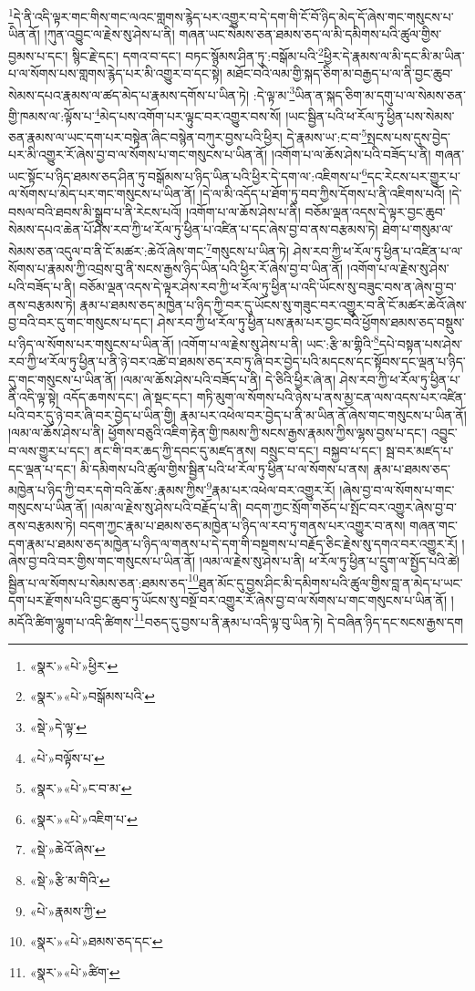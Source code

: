 \footnote{«སྣར་»«པེ་»ཕྱིར་}དེ་ནི་འདི་ལྟར་གང་གིས་གང་ལའང་གླགས་རྙེད་པར་འགྱུར་བ་དེ་དག་གི་ངོ་བོ་ཉིད་མེད་དོ་ཞེས་གང་གསུངས་པ་ཡིན་ནོ། །ཀུན་འབྱུང་ལ་རྗེས་སུ་ཤེས་པ་ནི། གཞན་ཡང་སེམས་ཅན་ཐམས་ཅད་ལ་མི་དམིགས་པའི་ཚུལ་གྱིས་བྱམས་པ་དང་། སྙིང་རྗེ་དང་། དགའ་བ་དང་། བཏང་སྙོམས་ཤིན་ཏུ་:བསྒོམ་པའི་\footnote{«སྣར་»«པེ་»བསྒོམས་པའི་}ཕྱིར་དེ་རྣམས་ལ་མི་དང་མི་མ་ཡིན་པ་ལ་སོགས་པས་གླགས་རྙེད་པར་མི་འགྱུར་བ་དང་སྟེ། མཐོང་བའི་ལམ་གྱི་སྐད་ཅིག་མ་བརྒྱད་པ་ལ་ནི་བྱང་ཆུབ་སེམས་དཔའ་རྣམས་ལ་ཚད་མེད་པ་རྣམས་དགོས་པ་ཡིན་ཏེ། :དེ་ལྟ་མ་\footnote{«སྡེ་»དེ་ལྟ་}ཡིན་ན་སྐད་ཅིག་མ་དགུ་པ་ལ་སེམས་ཅན་གྱི་ཁམས་ལ་:ལྟོས་པ་\footnote{«པེ་»བལྟོས་པ་}མེད་པས་འགོག་པར་ལྟུང་བར་འགྱུར་བས་སོ། །ཡང་སྦྱིན་པའི་ཕ་རོལ་ཏུ་ཕྱིན་པས་སེམས་ཅན་རྣམས་ལ་ཡང་དག་པར་བསྟེན་ཞིང་བསྙེན་བཀུར་བྱས་པའི་ཕྱིར། དེ་རྣམས་ཡ་:ང་བ་\footnote{«སྣར་»«པེ་»ང་བ་མ་}སྤངས་པས་དུས་བྱེད་པར་མི་འགྱུར་རོ་ཞེས་བྱ་བ་ལ་སོགས་པ་གང་གསུངས་པ་ཡིན་ནོ། །འགོག་པ་ལ་ཆོས་ཤེས་པའི་བཟོད་པ་ནི། གཞན་ཡང་སྟོང་པ་ཉིད་ཐམས་ཅད་ཤིན་ཏུ་བསྒོམས་པ་ཉིད་ཡིན་པའི་ཕྱིར་དེ་དག་ལ་:འཇིགས་པ་\footnote{«སྣར་»«པེ་»འཇིག་པ་}དང་རེངས་པར་གྱུར་པ་ལ་སོགས་པ་མེད་པར་གང་གསུངས་པ་ཡིན་ནོ། །དེ་ལ་མི་འདོད་པ་ཐོག་ཏུ་བབ་ཀྱིས་དོགས་པ་ནི་འཇིགས་པའོ། །དེ་བསལ་བའི་ཐབས་མི་སྒྲུབ་པ་ནི་རེངས་པའོ། །འགོག་པ་ལ་ཆོས་ཤེས་པ་ནི། བཅོམ་ལྡན་འདས་དེ་ལྟར་བྱང་ཆུབ་སེམས་དཔའ་ཆེན་པོ་ཤེས་རབ་ཀྱི་ཕ་རོལ་ཏུ་ཕྱིན་པ་འཛིན་པ་དང་ཞེས་བྱ་བ་ནས་བརྩམས་ཏེ། ཐེག་པ་གསུམ་ལ་སེམས་ཅན་འདུལ་བ་ནི་ངོ་མཚར་:ཆེའོ་ཞེས་གང་\footnote{«སྡེ་»ཆེའོ་ཞེས་}གསུངས་པ་ཡིན་ཏེ། ཤེས་རབ་ཀྱི་ཕ་རོལ་ཏུ་ཕྱིན་པ་འཛིན་པ་ལ་སོགས་པ་རྣམས་ཀྱི་འབྲས་བུ་ནི་སངས་རྒྱས་ཉིད་ཡིན་པའི་ཕྱིར་རོ་ཞེས་བྱ་བ་ཡིན་ནོ། །འགོག་པ་ལ་རྗེས་སུ་ཤེས་པའི་བཟོད་པ་ནི། བཅོམ་ལྡན་འདས་དེ་ལྟར་ཤེས་རབ་ཀྱི་ཕ་རོལ་ཏུ་ཕྱིན་པ་འདི་ཡོངས་སུ་བཟུང་བས་ན་ཞེས་བྱ་བ་ནས་བརྩམས་ཏེ། རྣམ་པ་ཐམས་ཅད་མཁྱེན་པ་ཉིད་ཀྱི་བར་དུ་ཡོངས་སུ་གཟུང་བར་འགྱུར་བ་ནི་ངོ་མཚར་ཆེའོ་ཞེས་བྱ་བའི་བར་དུ་གང་གསུངས་པ་དང་། ཤེས་རབ་ཀྱི་ཕ་རོལ་ཏུ་ཕྱིན་པས་རྣམ་པར་བྱང་བའི་ཕྱོགས་ཐམས་ཅད་བསྡུས་པ་ཉིད་ལ་སོགས་པར་གསུངས་པ་ཡིན་ནོ། །འགོག་པ་ལ་རྗེས་སུ་ཤེས་པ་ནི། ཡང་:རྩི་མ་གྷིའི་\footnote{«སྡེ་»རྩི་མ་གིའི་}དཔེ་བསྟན་པས་ཤེས་རབ་ཀྱི་ཕ་རོལ་ཏུ་ཕྱིན་པ་ནི་ཉེ་བར་འཚེ་བ་ཐམས་ཅད་རབ་ཏུ་ཞི་བར་བྱེད་པའི་མདངས་དང་སྟོབས་དང་ལྡན་པ་ཉིད་དུ་གང་གསུངས་པ་ཡིན་ནོ། །ལམ་ལ་ཆོས་ཤེས་པའི་བཟོད་པ་ནི། དེ་ཅིའི་ཕྱིར་ཞེ་ན། ཤེས་རབ་ཀྱི་ཕ་རོལ་ཏུ་ཕྱིན་པ་ནི་འདི་ལྟ་སྟེ། འདོད་ཆགས་དང་། ཞེ་སྡང་དང་། གཏི་མུག་ལ་སོགས་པའི་ཉེས་པ་ནས་མྱ་ངན་ལས་འདས་པར་འཛིན་པའི་བར་དུ་ཉེ་བར་ཞི་བར་བྱེད་པ་ཡིན་གྱི། རྣམ་པར་འཕེལ་བར་བྱེད་པ་ནི་མ་ཡིན་ནོ་ཞེས་གང་གསུངས་པ་ཡིན་ནོ། །ལམ་ལ་ཆོས་ཤེས་པ་ནི། ཕྱོགས་བཅུའི་འཇིག་རྟེན་གྱི་ཁམས་ཀྱི་སངས་རྒྱས་རྣམས་ཀྱིས་ལྷས་བྱས་པ་དང་། འབྱུང་བ་ལས་གྱུར་པ་དང་། ནང་གི་བར་ཆད་ཀྱི་དབང་དུ་མཛད་ནས། བསྲུང་བ་དང་། བསྐྱབ་པ་དང་། སྦ་བར་མཛད་པ་དང་ལྡན་པ་དང་། མི་དམིགས་པའི་ཚུལ་གྱིས་སྦྱིན་པའི་ཕ་རོལ་ཏུ་ཕྱིན་པ་ལ་སོགས་པ་ནས། རྣམ་པ་ཐམས་ཅད་མཁྱེན་པ་ཉིད་ཀྱི་བར་དགེ་བའི་ཆོས་:རྣམས་ཀྱིས་\footnote{«པེ་»རྣམས་ཀྱི་}རྣམ་པར་འཕེལ་བར་འགྱུར་རོ། །ཞེས་བྱ་བ་ལ་སོགས་པ་གང་གསུངས་པ་ཡིན་ནོ། །ལམ་ལ་རྗེས་སུ་ཤེས་པའི་བརྗོད་པ་ནི། བདག་ཀྱང་སྲོག་གཅོད་པ་སྤོང་བར་འགྱུར་ཞེས་བྱ་བ་ནས་བརྩམས་ཏེ། བདག་ཀྱང་རྣམ་པ་ཐམས་ཅད་མཁྱེན་པ་ཉིད་ལ་རབ་ཏུ་གནས་པར་འགྱུར་བ་ནས། གཞན་གང་དག་རྣམ་པ་ཐམས་ཅད་མཁྱེན་པ་ཉིད་ལ་གནས་པ་དེ་དག་གི་བསྔགས་པ་བརྗོད་ཅིང་རྗེས་སུ་དགའ་བར་འགྱུར་རོ། །ཞེས་བྱ་བའི་བར་གྱིས་གང་གསུངས་པ་ཡིན་ནོ། །ལམ་ལ་རྗེས་སུ་ཤེས་པ་ནི། ཕ་རོལ་ཏུ་ཕྱིན་པ་དྲུག་ལ་སྤྱོད་པའི་ཚེ། སྦྱིན་པ་ལ་སོགས་པ་སེམས་ཅན་:ཐམས་ཅད་\footnote{«སྣར་»«པེ་»ཐམས་ཅད་དང་}ཐུན་མོང་དུ་བྱས་ཤིང་མི་དམིགས་པའི་ཚུལ་གྱིས་བླ་ན་མེད་པ་ཡང་དག་པར་རྫོགས་པའི་བྱང་ཆུབ་ཏུ་ཡོངས་སུ་བསྔོ་བར་འགྱུར་རོ་ཞེས་བྱ་བ་ལ་སོགས་པ་གང་གསུངས་པ་ཡིན་ནོ། །མདོའི་ཚིག་ལྷུག་པ་འདི་ཚིགས་\footnote{«སྣར་»«པེ་»ཚིག་}བཅད་དུ་བྱས་པ་ནི་རྣམ་པ་འདི་ལྟ་བུ་ཡིན་ཏེ། དེ་བཞིན་ཉིད་དང་སངས་རྒྱས་དག 